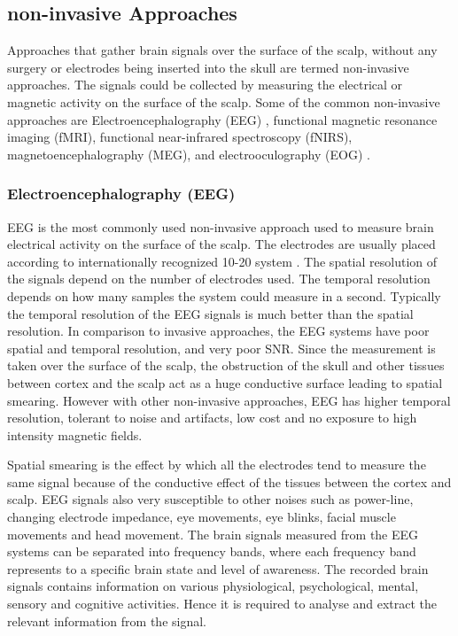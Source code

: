 \subsection{non-invasive Approaches}
Approaches that gather brain signals over the surface of the scalp, without any surgery or electrodes being inserted into the skull are termed non-invasive approaches. The signals could be collected by measuring the electrical or magnetic activity on the surface of the scalp. Some of the common non-invasive approaches are Electroencephalography (EEG) , functional magnetic resonance imaging (fMRI), functional near-infrared spectroscopy (fNIRS), magnetoencephalography (MEG), and electrooculography (EOG) .
    

\subsubsection{Electroencephalography (EEG)}
EEG is the most commonly used non-invasive approach used to measure brain electrical activity on the surface of the scalp. The electrodes are usually placed according to internationally recognized 10-20 system \cite{1020_system}. The spatial resolution of the signals depend on the number of electrodes used. The temporal resolution depends on how many samples the system could measure in a second. Typically the temporal resolution of the EEG signals is much better than the spatial resolution. In comparison to invasive approaches, the EEG systems have poor spatial and temporal resolution, and very poor SNR. Since the measurement is taken
over the surface of the scalp, the obstruction of the skull and other tissues between cortex and the scalp act as a huge conductive surface leading to spatial smearing. However with other non-invasive approaches, EEG has higher temporal resolution, tolerant to noise and artifacts, low cost and no exposure to high intensity magnetic fields.

Spatial smearing is the effect by which all the electrodes tend to measure the same signal because of the conductive effect of the tissues between the cortex and scalp. EEG signals also very susceptible to other noises such as power-line, changing electrode impedance, eye movements, eye blinks, facial muscle movements and head movement. The brain signals measured from the EEG systems can be separated into frequency bands, where each frequency band represents to a specific brain state and level of awareness. The recorded brain signals contains information on various physiological, psychological, mental, sensory and cognitive activities. Hence it is required to analyse and extract the relevant information from the signal.

